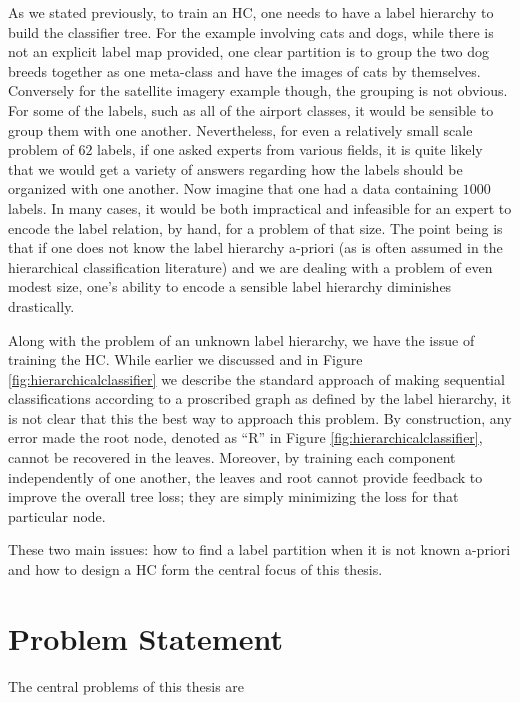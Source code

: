 \documentclass[draft, ../thesis.tex]{subfiles}
\begin{document}
    As we stated previously, to train an HC, one needs to have a label hierarchy
    to build the classifier tree. For the example involving cats and dogs, while
    there is not an explicit label map provided, one clear partition is to group
    the two dog breeds together as one meta-class and have the images of cats by
    themselves. Conversely for the satellite imagery example though, the
    grouping is not obvious. For some of the labels, such as all of the airport
    classes, it would be sensible to group them with one another. Nevertheless,
    for even a relatively small scale problem of $62$ labels, if one asked
    experts from various fields, it is quite likely that we would get a variety
    of answers regarding how the labels should be organized with one another.
    Now imagine that one had a data containing $1000$ labels. In many cases, it
    would be both impractical and infeasible for an expert to encode the label
    relation, by hand, for a problem of that size. The point being is that if
    one does not know the label hierarchy a-priori (as is often assumed in the
    hierarchical classification literature) and we are dealing with a problem of
    even modest size, one's ability to encode a sensible label hierarchy
    diminishes drastically.

    Along with the problem of an unknown label hierarchy, we have the issue of
    training the HC. While earlier we discussed and in Figure
    \ref{fig:hierarchicalclassifier} we describe the standard approach of making
    sequential classifications according to a proscribed graph as defined by the
    label hierarchy, it is not clear that this the best way to approach this
    problem. By construction, any error made the root node, denoted as ``R'' in
    Figure \ref{fig:hierarchicalclassifier}, cannot be recovered in the leaves.
    Moreover, by training each component independently of one another, the
    leaves and root cannot provide feedback to improve the overall tree loss;
    they are simply minimizing the loss for that particular node.

    These two main issues: how to find a label partition when it is not known
    a-priori and how to design a HC form the central focus of this thesis.

    \section{Problem Statement}
    \label{problem_statement}
    The central problems of this thesis are
\end{document}
